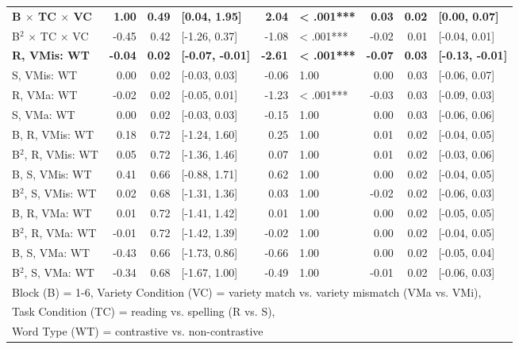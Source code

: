 \documentclass[doc,floatsintext]{apa6}
\begin{document}
\begin{table}[!h]
{\begin{tabular}{lrrlrlrrl}
\textbf{B $\times$ TC $\times$ VC} & \textbf{1.00} & \textbf{0.49} & \textbf{[0.04, 1.95]} & \textbf{2.04} & \textbf{< .001***} & \textbf{0.03} & \textbf{0.02} & \textbf{[0.00, 0.07]}\\
B$^2$ $\times$ TC $\times$ VC & -0.45 & 0.42 & [-1.26, 0.37] & -1.08 & < .001*** & -0.02 & 0.01 & [-0.04, 0.01]\\
\textbf{R, VMis: WT} & \textbf{-0.04} & \textbf{0.02} & \textbf{[-0.07, -0.01]} & \textbf{-2.61} & \textbf{< .001***} & \textbf{-0.07} & \textbf{0.03} & \textbf{[-0.13, -0.01]}\\
S, VMis: WT & 0.00 & 0.02 & [-0.03, 0.03] & -0.06 & 1.00 & 0.00 & 0.03 & [-0.06, 0.07]\\
R, VMa: WT & -0.02 & 0.02 & [-0.05, 0.01] & -1.23 & < .001*** & -0.03 & 0.03 & [-0.09, 0.03]\\
S, VMa: WT & 0.00 & 0.02 & [-0.03, 0.03] & -0.15 & 1.00 & 0.00 & 0.03 & [-0.06, 0.06]\\
B, R, VMis: WT & 0.18 & 0.72 & [-1.24, 1.60] & 0.25 & 1.00 & 0.01 & 0.02 & [-0.04, 0.05]\\
B$^2$, R, VMis: WT & 0.05 & 0.72 & [-1.36, 1.46] & 0.07 & 1.00 & 0.01 & 0.02 & [-0.03, 0.06]\\
B, S, VMis: WT & 0.41 & 0.66 & [-0.88, 1.71] & 0.62 & 1.00 & 0.00 & 0.02 & [-0.04, 0.05]\\
B$^2$, S, VMis: WT & 0.02 & 0.68 & [-1.31, 1.36] & 0.03 & 1.00 & -0.02 & 0.02 & [-0.06, 0.03]\\
B, R, VMa: WT & 0.01 & 0.72 & [-1.41, 1.42] & 0.01 & 1.00 & 0.00 & 0.02 & [-0.05, 0.05]\\
B$^2$, R, VMa: WT & -0.01 & 0.72 & [-1.42, 1.39] & -0.02 & 1.00 & 0.00 & 0.02 & [-0.04, 0.05]\\
B, S, VMa: WT & -0.43 & 0.66 & [-1.73, 0.86] & -0.66 & 1.00 & 0.00 & 0.02 & [-0.05, 0.04]\\
B$^2$, S, VMa: WT & -0.34 & 0.68 & [-1.67, 1.00] & -0.49 & 1.00 & -0.01 & 0.02 & [-0.06, 0.03]\\
\bottomrule
\multicolumn{9}{l}{Block (B) = 1-6, Variety Condition (VC) = variety match vs. variety mismatch (VMa vs. VMi),}\\
\multicolumn{9}{l}{Task Condition (TC) = reading vs. spelling (R vs. S),}\\
\multicolumn{9}{l}{Word Type (WT) = contrastive vs. non-contrastive}\\
\end{tabular}}
\end{table}
\end{document}
